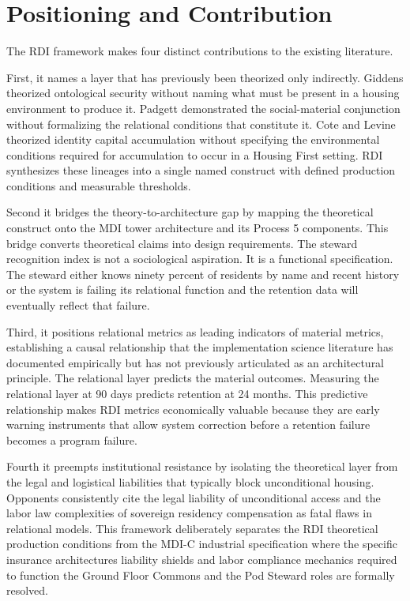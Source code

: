 \documentclass[12pt, letterpaper]{article}
\begin{document}
\clearpage
\section{Positioning and Contribution}

The RDI framework makes four distinct contributions to the existing literature.

First, it names a layer that has previously been theorized only indirectly. Giddens \citep{giddens_1991} theorized ontological security without naming what must be present in a housing environment to produce it. Padgett \citep{padgett_2007} demonstrated the social-material conjunction without formalizing the relational conditions that constitute it. Cote and Levine \citep{cote_levine_2002} theorized identity capital accumulation without specifying the environmental conditions required for accumulation to occur in a Housing First setting. RDI synthesizes these lineages into a single named construct with defined production conditions and measurable thresholds.

Second it bridges the theory-to-architecture gap by mapping the theoretical construct onto the MDI tower architecture and its Process 5 components. This bridge converts theoretical claims into design requirements. The steward recognition index is not a sociological aspiration. It is a functional specification. The steward either knows ninety percent of residents by name and recent history or the system is failing its relational function and the retention data will eventually reflect that failure.

Third, it positions relational metrics as leading indicators of material metrics, establishing a causal relationship that the implementation science literature has documented empirically but has not previously articulated as an architectural principle. The relational layer predicts the material outcomes. Measuring the relational layer at 90 days predicts retention at 24 months. This predictive relationship makes RDI metrics economically valuable because they are early warning instruments that allow system correction before a retention failure becomes a program failure.

Fourth it preempts institutional resistance by isolating the theoretical layer from the legal and logistical liabilities that typically block unconditional housing. Opponents consistently cite the legal liability of unconditional access and the labor law complexities of sovereign residency compensation as fatal flaws in relational models. This framework deliberately separates the RDI theoretical production conditions from the MDI-C industrial specification where the specific insurance architectures liability shields and labor compliance mechanics required to function the Ground Floor Commons and the Pod Steward roles are formally resolved.

\newpage
{}


\end{document}
